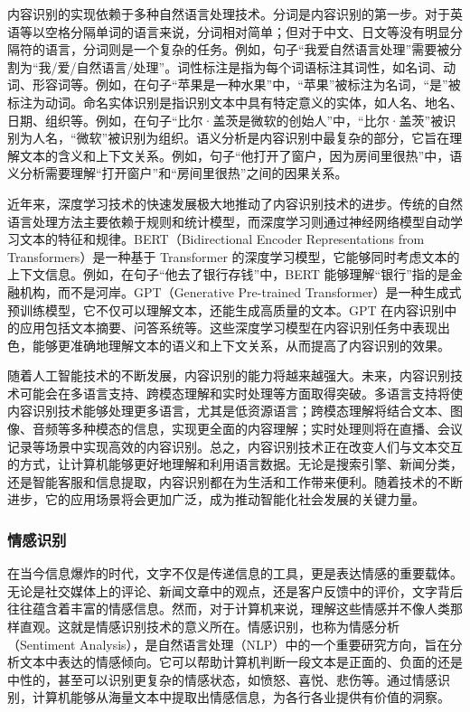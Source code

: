内容识别的实现依赖于多种自然语言处理技术。分词是内容识别的第一步。对于英语等以空格分隔单词的语言来说，分词相对简单；但对于中文、日文等没有明显分隔符的语言，分词则是一个复杂的任务。例如，句子“我爱自然语言处理”需要被分割为“我/爱/自然语言/处理”。词性标注是指为每个词语标注其词性，如名词、动词、形容词等。例如，在句子“苹果是一种水果”中，“苹果”被标注为名词，“是”被标注为动词。命名实体识别是指识别文本中具有特定意义的实体，如人名、地名、日期、组织等。例如，在句子“比尔·盖茨是微软的创始人”中，“比尔·盖茨”被识别为人名，“微软”被识别为组织。语义分析是内容识别中最复杂的部分，它旨在理解文本的含义和上下文关系。例如，句子“他打开了窗户，因为房间里很热”中，语义分析需要理解“打开窗户”和“房间里很热”之间的因果关系。

近年来，深度学习技术的快速发展极大地推动了内容识别技术的进步。传统的自然语言处理方法主要依赖于规则和统计模型，而深度学习则通过神经网络模型自动学习文本的特征和规律。BERT（Bidirectional Encoder Representations from Transformers）是一种基于 Transformer 的深度学习模型，它能够同时考虑文本的上下文信息。例如，在句子“他去了银行存钱”中，BERT 能够理解“银行”指的是金融机构，而不是河岸。GPT（Generative Pre-trained Transformer）是一种生成式预训练模型，它不仅可以理解文本，还能生成高质量的文本。GPT 在内容识别中的应用包括文本摘要、问答系统等。这些深度学习模型在内容识别任务中表现出色，能够更准确地理解文本的语义和上下文关系，从而提高了内容识别的效果。

随着人工智能技术的不断发展，内容识别的能力将越来越强大。未来，内容识别技术可能会在多语言支持、跨模态理解和实时处理等方面取得突破。多语言支持将使内容识别技术能够处理更多语言，尤其是低资源语言；跨模态理解将结合文本、图像、音频等多种模态的信息，实现更全面的内容理解；实时处理则将在直播、会议记录等场景中实现高效的内容识别。总之，内容识别技术正在改变人们与文本交互的方式，让计算机能够更好地理解和利用语言数据。无论是搜索引擎、新闻分类，还是智能客服和信息提取，内容识别都在为生活和工作带来便利。随着技术的不断进步，它的应用场景将会更加广泛，成为推动智能化社会发展的关键力量。


\subsubsection{情感识别}

在当今信息爆炸的时代，文字不仅是传递信息的工具，更是表达情感的重要载体。无论是社交媒体上的评论、新闻文章中的观点，还是客户反馈中的评价，文字背后往往蕴含着丰富的情感信息。然而，对于计算机来说，理解这些情感并不像人类那样直观。这就是情感识别技术的意义所在。情感识别，也称为情感分析（Sentiment Analysis），是自然语言处理（NLP）中的一个重要研究方向，旨在分析文本中表达的情感倾向。它可以帮助计算机判断一段文本是正面的、负面的还是中性的，甚至可以识别更复杂的情感状态，如愤怒、喜悦、悲伤等。通过情感识别，计算机能够从海量文本中提取出情感信息，为各行各业提供有价值的洞察。

